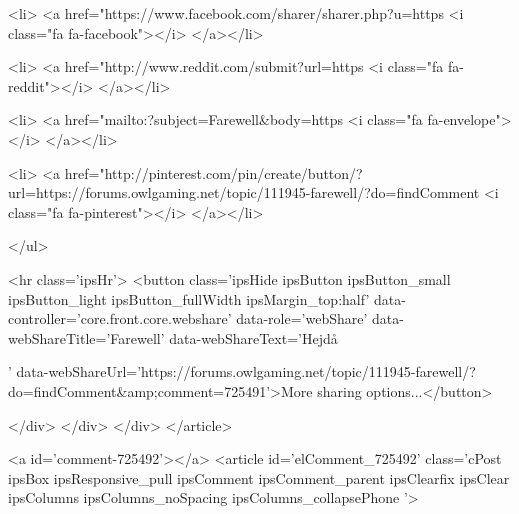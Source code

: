 			<li>
<a href="https://www.facebook.com/sharer/sharer.php?u=https%
	<i class="fa fa-facebook"></i>
</a></li>
		
			<li>
<a href="http://www.reddit.com/submit?url=https%
	<i class="fa fa-reddit"></i>
</a></li>
		
			<li>
<a href="mailto:?subject=Farewell&body=https%
	<i class="fa fa-envelope"></i>
</a></li>
		
			<li>
<a href="http://pinterest.com/pin/create/button/?url=https://forums.owlgaming.net/topic/111945-farewell/?do=findComment%
	<i class="fa fa-pinterest"></i>
</a></li>
		
	</ul>


	<hr class='ipsHr'>
	<button class='ipsHide ipsButton ipsButton_small ipsButton_light ipsButton_fullWidth ipsMargin_top:half' data-controller='core.front.core.webshare' data-role='webShare' data-webShareTitle='Farewell' data-webShareText='Hejdå
 
' data-webShareUrl='https://forums.owlgaming.net/topic/111945-farewell/?do=findComment&amp;comment=725491'>More sharing options...</button>

	
</div>
</div>
	</div>
</article>
					
				
					
					
					



<a id='comment-725492'></a>
<article  id='elComment_725492' class='cPost ipsBox ipsResponsive_pull  ipsComment  ipsComment_parent ipsClearfix ipsClear ipsColumns ipsColumns_noSpacing ipsColumns_collapsePhone    '>
	

